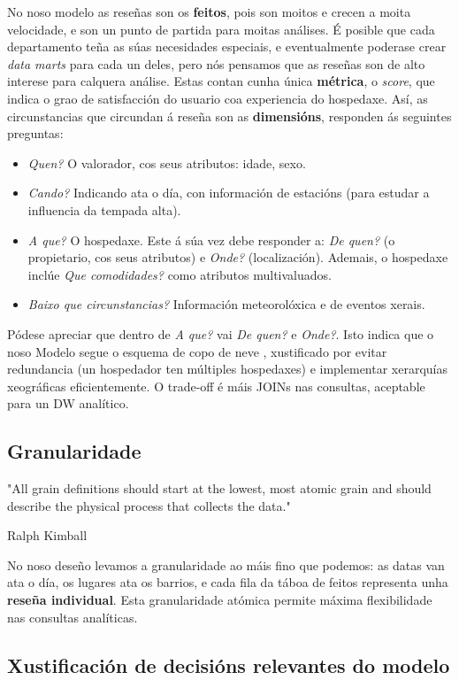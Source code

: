 \documentclass[12pt,a4paper]{article}
\begin{document}
No noso modelo as reseñas son os \textbf{feitos}, pois son moitos e crecen a moita velocidade, e son un punto de partida para moitas análises. É posible que cada departamento teña as súas necesidades especiais, e eventualmente poderase crear \emph{data marts} para cada un deles, pero nós pensamos que as reseñas son de alto interese para calquera análise. Estas contan cunha única \textbf{métrica}, o \emph{score}, que indica o grao de satisfacción do usuario coa experiencia do hospedaxe. Así, as circunstancias que circundan á reseña son as \textbf{dimensións}, responden ás seguintes preguntas:
\begin{itemize}
	\item \emph{Quen?} O valorador, cos seus atributos: idade, sexo.
	\item \emph{Cando?} Indicando ata o día, con información de estacións (para estudar a influencia da tempada alta).
	\item \emph{A que?} O hospedaxe. Este á súa vez debe responder a: \emph{De quen?} (o propietario, cos seus atributos) e \emph{Onde?} (localización). Ademais, o hospedaxe inclúe \emph{Que comodidades?} como atributos multivaluados.
	\item \emph{Baixo que circunstancias?} Información meteorolóxica e de eventos xerais.
\end{itemize}

Pódese apreciar que dentro de \emph{A que?} vai \emph{De quen?} e \emph{Onde?}. Isto indica que o noso Modelo segue o esquema de copo de neve \cite{kimball1996}, xustificado por evitar redundancia (un hospedador ten múltiples hospedaxes) e implementar xerarquías xeográficas eficientemente. O trade-off é máis JOINs nas consultas, aceptable para un DW analítico.

\subsection{Granularidade}

\epigraph{
"All grain definitions should start at the lowest, most atomic grain and should describe the physical process that collects the data."
}{
Ralph Kimball \cite{kimball2007}
}

No noso deseño levamos a granularidade ao máis fino que podemos: as datas van ata o día, os lugares ata os barrios, e cada fila da táboa de feitos representa unha \textbf{reseña individual}. Esta granularidade atómica permite máxima flexibilidade nas consultas analíticas.

\subsection{Xustificación de decisións relevantes do modelo}
\end{document}
